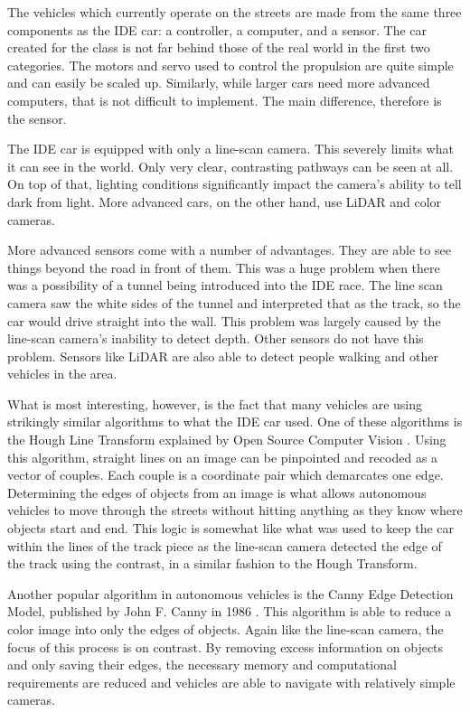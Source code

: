 \documentclass[conference]{IEEEtran}
\begin{document}
    The vehicles which currently operate on the streets are made from the same
    three components as the IDE car: a controller, a computer, and a sensor.
    The car created for the class is not far behind those of the real world
    in the first two categories. The motors and servo used to control the
    propulsion are quite simple and can easily be scaled up. Similarly, while
    larger cars need more advanced computers, that is not difficult to
    implement. The main difference, therefore is the sensor.

    The IDE car is equipped with only a line-scan camera. This severely limits
    what it can see in the world. Only very clear, contrasting pathways can
    be seen at all. On top of that, lighting conditions significantly impact
    the camera's ability to tell dark from light. More advanced cars, on the
    other hand, use LiDAR and color cameras.

    More advanced sensors come with a number of advantages. They are able to
    see things beyond the road in front of them. This was a huge problem when
    there was a possibility of a tunnel being introduced into the IDE race.
    The line scan camera saw the white sides of the tunnel and interpreted 
    that as the track, so the car would drive straight into the wall. This
    problem was largely caused by the line-scan camera's inability to detect
    depth. Other sensors do not have this problem. Sensors like LiDAR are also
    able to detect people walking and other vehicles in the area.

    What is most interesting, however, is the fact that many vehicles are
    using strikingly similar algorithms to what the IDE car used. One of these
    algorithms is the Hough Line Transform explained by Open Source Computer
    Vision \cite{b3}. Using this algorithm, straight lines on an image can be pinpointed
    and recoded as a vector of couples. Each couple is a coordinate pair which
    demarcates one edge. Determining the edges of objects from an image is
    what allows autonomous vehicles to move through the streets without
    hitting anything as they know where objects start and end. This logic is
    somewhat like what was used to keep the car within the lines of the track
    piece as the line-scan camera detected the edge of the track using the
    contrast, in a similar fashion to the Hough Transform.

    Another popular algorithm in autonomous vehicles is the Canny Edge
    Detection Model, published by John F. Canny in 1986 \cite{b4}. This algorithm is
    able to reduce a color image into only the edges of objects. Again like
    the line-scan camera, the focus of this process is on contrast. By
    removing excess information on objects and only saving their edges, the
    necessary memory and computational requirements are reduced and vehicles
    are able to navigate with relatively simple cameras.
\end{document}
